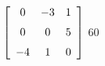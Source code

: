 {$\left[ \begin {array}{ccc} 0&-3&1\\\noalign{\medskip}0&0&5
\\\noalign{\medskip}-4&1&0\end {array} \right]$} 
{$60$}



  

